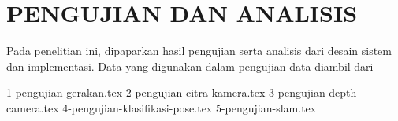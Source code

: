 \chapter{PENGUJIAN DAN ANALISIS}
\label{chap:pengujiananalisis}

Pada penelitian ini, dipaparkan hasil pengujian serta analisis dari desain sistem dan implementasi.
Data yang digunakan dalam pengujian data diambil dari \textcolor{red}{\lipsum[1][1-5]}

{1-pengujian-gerakan.tex}
{2-pengujian-citra-kamera.tex}
{3-pengujian-depth-camera.tex}
{4-pengujian-klasifikasi-pose.tex}
{5-pengujian-slam.tex}
